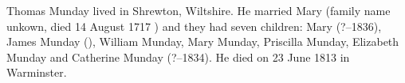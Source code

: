 
Thomas Munday lived in Shrewton, Wiltshire.  He married Mary (family name unkown, died 14 August 1717 \cite{ThomasMundayDeath}) and they had seven children: Mary (?--1836), James Munday (), William Munday, Mary Munday, Priscilla Munday, Elizabeth Munday and Catherine Munday (?--1834). He died on 23 June 1813 in Warminster.\cite{ThomasMundayDeath}
